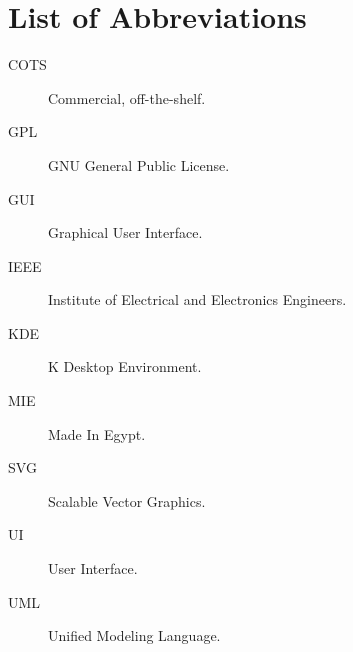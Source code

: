 \chapter*{List of Abbreviations}
\thispagestyle{plain}
\beginchapter

\begin{description}
\item [COTS] Commercial, off-the-shelf.
\item [GPL] GNU General Public License.
\item [GUI] Graphical User Interface.
\item [IEEE] Institute of Electrical and Electronics Engineers.
\item [KDE] K Desktop Environment.
\item [MIE] Made In Egypt.
\item [SVG] Scalable Vector Graphics.
\item [UI] User Interface.
\item [UML] Unified Modeling Language.
\end{description}

